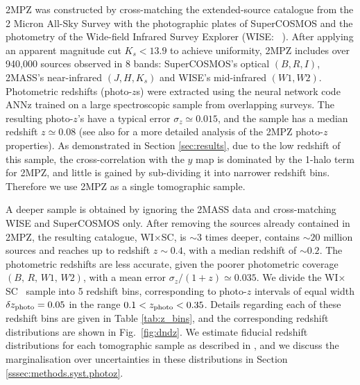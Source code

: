 \documentclass[useAMS,usenatbib]{mn2e}
\newcommand{\wisc}{WI$\times$SC}
\def\citejap#1{\citeauthor{#1}\ \citeyear{#1}}
\begin{document}
    2MPZ was constructed by cross-matching the extended-source catalogue from the 2 Micron All-Sky Survey \citep[2MASS,][]{2006AJ....131.1163S,2000AJ....119.2498J} with the photographic plates of SuperCOSMOS \citep{2001MNRAS.326.1295H,2016MNRAS.462.2085P} and the photometry of the Wide-field Infrared Survey Explorer (WISE: \citejap{2010AJ....140.1868W}). After applying an apparent magnitude cut $K_s<13.9$ to achieve uniformity, 2MPZ includes over 940,000 sources observed in 8 bands: SuperCOSMOS's optical $(B,R,I)$, 2MASS's near-infrared $(J,H,K_s)$ and WISE's mid-infrared $(W1,W2)$. Photometric redshifts (photo-$z$s) were extracted using the neural network code ANNz \citep{2004PASP..116..345C} trained on a large spectroscopic sample from overlapping surveys. The resulting photo-$z$'s have a typical error $\sigma_z\simeq0.015$, and the sample has a median redshift $z\simeq0.08$ (see also \citealt{2018MNRAS.476.1050B} for a more detailed analysis of the 2MPZ photo-$z$ properties). As demonstrated in Section \ref{sec:results}, due to the low redshift of this sample, the cross-correlation with the $y$ map is dominated by the 1-halo term for 2MPZ, and little is gained by sub-dividing it into narrower redshift bins. Therefore we use 2MPZ as a single tomographic sample.
    
    A deeper sample is obtained by ignoring the 2MASS data and cross-matching WISE and SuperCOSMOS only. After removing the sources already contained in 2MPZ, the resulting catalogue, \wisc, is $\sim3$ times deeper, contains $\sim20$ million sources and reaches up to redshift $z\sim0.4$, with a median redshift of $\sim0.2$. The photometric redshifts are less accurate, given the poorer photometric coverage $(B,\,R,\,W1,\,W2)$, with a mean error $\sigma_z/(1+z)\simeq0.035$. We divide the \wisc~ sample into 5 redshift bins, corresponding to photo-$z$ intervals of equal width $\delta z_{\rm photo}=0.05$ in the range $0.1<z_{\rm photo}<0.35$. Details regarding each of these redshift bins are given in Table \ref{tab:z_bins}, and the corresponding redshift distributions are shown in Fig.\!~\ref{fig:dndz}. We estimate fiducial redshift distributions for each tomographic sample as described in \cite{2018MNRAS.481.1133P}, and we discuss the marginalisation over uncertainties in these distributions in Section \ref{sssec:methods.syst.photoz}.
\end{document}
